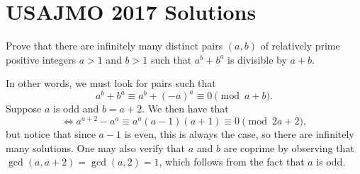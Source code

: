 \documentclass[a4paper, 10pt]{article}
\begin{document}
\section*{USAJMO 2017 Solutions}

\begin{chirpbox}
\begin{problemnum}
    Prove that there are infinitely many distinct pairs \( (a, b) \) of relatively prime positive integers \( a > 1 \) and \( b > 1 \) such that \( a^b + b^a \) is divisible by \( a + b \).
\end{problemnum}
\end{chirpbox}

\begin{solution}
    In other words, we must look for pairs such that
    \[
        a^b + b^a \equiv a^b + (-a)^a \equiv 0 \pmod{a+b}
    .\]
    Suppose \( a \) is odd and \( b = a + 2 \). We then have that
    \[
        \iff a^{a+2} - a^a \equiv a^a (a - 1)(a+1) \equiv 0 \pmod{2a + 2}
    ,\]
    but notice that since \( a - 1 \) is even, this is always the case, so there are infinitely many solutions. One may
    also verify that \( a \) and \( b \) are coprime by observing that \(
    \gcd(a, a + 2) = \gcd(a, 2) = 1 \), which follows from the fact that \( a
    \) is odd.
\end{solution}
\end{document}
